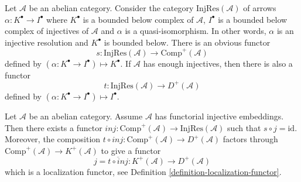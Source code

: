 \medskip\noindent
Let $\mathcal{A}$ be an abelian category.
Consider the category $\text{InjRes}(\mathcal{A})$
of arrows $\alpha : K^\bullet \to I^\bullet$
where $K^\bullet$ is a bounded below complex of $\mathcal{A}$,
$I^\bullet$ is a bounded below complex of injectives of $\mathcal{A}$
and $\alpha$ is a quasi-isomorphism. In other words, $\alpha$ is
an injective resolution and $K^\bullet$ is bounded below.
There is an obvious functor
$$
s : \text{InjRes}(\mathcal{A}) \longrightarrow \text{Comp}^{+}(\mathcal{A})
$$
defined by $(\alpha : K^\bullet \to I^\bullet) \mapsto K^\bullet$.
If $\mathcal{A}$ has enough injectives, then there is also
a functor
$$
t : \text{InjRes}(\mathcal{A}) \longrightarrow D^{+}(\mathcal{A})
$$
defined by $(\alpha : K^\bullet \to I^\bullet) \mapsto I^\bullet$.

\begin{lemma}
\label{lemma-functorial-injective-resolutions}
Let $\mathcal{A}$ be an abelian category.
Assume $\mathcal{A}$ has functorial injective embeddings.
Then there exists a functor
$inj : \text{Comp}^{+}(\mathcal{A}) \to \text{InjRes}(\mathcal{A})$
such that $s \circ j = \text{id}$. Moreover, the composition
$t \circ inj : \text{Comp}^{+}(\mathcal{A}) \to D^{+}(\mathcal{A})$
factors through $\text{Comp}^{+}(\mathcal{A}) \to K^{+}(\mathcal{A})$
to give a functor
$$
j = \overline{t \circ inj} :
K^{+}(\mathcal{A})
\longrightarrow
D^{+}(\mathcal{A})
$$
which is a localization functor, see
Definition \ref{definition-localization-functor}.
\end{lemma}

